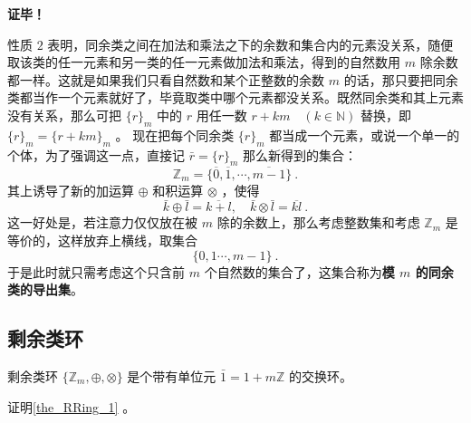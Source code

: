 \textbf{证毕！}

性质 $2$ 表明，同余类之间在加法和乘法之下的余数和集合内的元素没关系，随便取该类的任一元素和另一类的任一元素做加法和乘法，得到的自然数用 $m$ 除余数都一样。这就是如果我们只看自然数和某个正整数的余数 $m$ 的话，那只要把同余类都当作一个元素就好了，毕竟取类中哪个元素都没关系。既然同余类和其上元素没有关系，那么可把 $\{r\}_m$ 中的 $r$ 用任一数 $r+k m \quad(k \in \mathbb{N})$ 替换，即 $\{r\}_m=\{r+k m\}_m$ 。
现在把每个同余类 $\{r\}_m$ 都当成一个元素，或说一个单一的个体，为了强调这一点，直接记 $\bar{r}=\{r\}_m$ 那么新得到的集合：
\begin{equation}
\mathbb{Z}_m=\{\overline{0}, \overline{1}, \cdots, \overline{m-1}\}~.
\end{equation}
其上诱导了新的加运算 $\oplus$ 和积运算 $\otimes$ ，使得
\begin{equation}
\bar{k} \oplus \bar{l}=\overline{k+l}, \quad \bar{k} \otimes \bar{l}=\overline{k l}~.
\end{equation}
这一好处是，若注意力仅仅放在被 $m$ 除的余数上，那么考虑整数集和考虑 $\mathbb{Z}_m$ 是等价的，这样放弃上横线，取集合
$$
\{0,1 \cdots, m-1\}~.
$$
于是此时就只需考虑这个只含前 $m$ 个自然数的集合了，这集合称为\textbf{模 $m$ 的同余类的导出集}。
\subsection{剩余类环}
\begin{theorem}{剩余类环}\label{the_RRing_1}
$\{\mathbb Z_m,\oplus,\otimes\}$ 是个带有单位元 $\bar 1=1+m\mathbb Z$ 的交换环。
\end{theorem}
\begin{exercise}{}
证明\autoref{the_RRing_1} 。
\end{exercise}